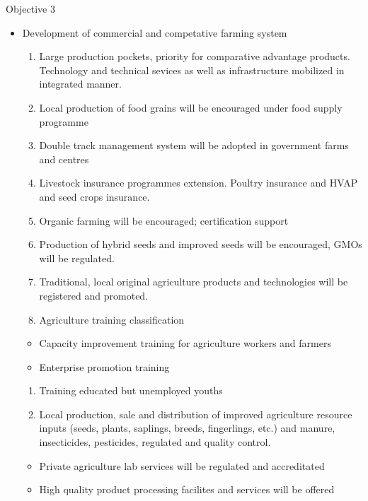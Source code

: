 \documentclass[
  openany]{book}
\providecommand{\tightlist}{%
  \setlength{\itemsep}{0pt}\setlength{\parskip}{0pt}}
\begin{document}
Objective 3

\begin{itemize}
\tightlist
\item
  Development of commercial and competative farming system

  \begin{enumerate}
  \def\labelenumi{\arabic{enumi}.}
  \tightlist
  \item
    Large production pockets, priority for comparative advantage products. Technology and technical sevices as well as infrastructure mobilized in integrated manner.
  \item
    Local production of food grains will be encouraged under food supply programme
  \item
    Double track management system will be adopted in government farms and centres
  \item
    Livestock insurance programmes extension. Poultry insurance and HVAP and seed crops insurance.
  \item
    Organic farming will be encouraged; certification support
  \item
    Production of hybrid seeds and improved seeds will be encouraged, GMOs will be regulated.
  \item
    Traditional, local original agriculture products and technologies will be registered and promoted.
  \item
    Agriculture training classification
  \end{enumerate}

  \begin{itemize}
  \tightlist
  \item
    Capacity improvement training for agriculture workers and farmers
  \item
    Enterprise promotion training
  \end{itemize}

  \begin{enumerate}
  \def\labelenumi{\arabic{enumi}.}
  \setcounter{enumi}{8}
  \tightlist
  \item
    Training educated but unemployed youths
  \item
    Local production, sale and distribution of improved agriculture resource inputs (seeds, plants, saplings, breeds, fingerlings, etc.) and manure, insecticides, pesticides, regulated and quality control.
  \end{enumerate}

  \begin{itemize}
  \tightlist
  \item
    Private agriculture lab services will be regulated and accreditated
  \item
    High quality product processing facilites and services will be offered
  \end{itemize}


\end{itemize}
\end{document}
